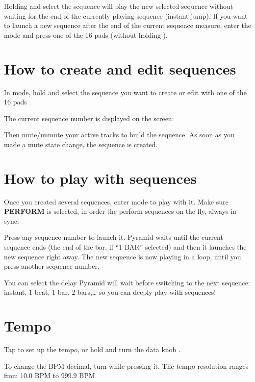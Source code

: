 Holding  and select the sequence will play the new selected sequence without waiting for the end of the currently playing sequence (instant jump). If you want to launch a new sequence after the end of the current sequence measure, enter the  mode and press one of the 16 pads \stepbystepicon{} (without holding ).


\section{How to create and edit sequences}

In  mode, hold  and select the sequence you want to create or edit with one of the 16 pads \stepbystepicon{}.

The current sequence number is displayed on the screen:


Then mute/unmute your active tracks to build the sequence. As soon as you made a mute state change, the sequence is created.


\section{How to play with sequences}

Once you created several sequences, enter  mode to play with it. Make sure \textbf{PERFORM} is selected, in order the perform sequences on the fly, always in sync:


Press any sequence number \stepbystepicon{} to launch it. Pyramid waits until the current sequence ends (the end of the bar, if ``1 BAR'' selected) and then it launches the new sequence right away. The new sequence is now playing in a loop, until you press another sequence number.

You can select the delay Pyramid will wait before switching to the next sequence: instant, 1 beat, 1 bar, 2 bars,\ldots{} so you can deeply play with sequences!


\section{Tempo}

Tap  to set up the tempo, or hold  and turn the data knob \encodericon{}.

To change the BPM decimal, turn \encodericon{} while pressing it. The tempo resolution ranges from 10.0 BPM to 999.9 BPM.

